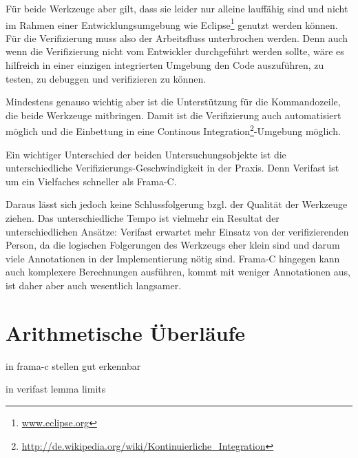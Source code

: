 Für beide Werkzeuge aber gilt, dass sie leider nur alleine lauffähig sind und nicht im Rahmen
einer Entwicklungsumgebung wie Eclipse\footnote{\url{www.eclipse.org}} genutzt werden können. 
Für die Verifizierung muss also der Arbeitsfluss unterbrochen werden. Denn auch wenn die Verifizierung
nicht vom Entwickler durchgeführt werden sollte, wäre es hilfreich in einer einzigen integrierten Umgebung
den Code auszuführen, zu testen, zu debuggen und verifizieren zu können.

Mindestens genauso wichtig aber ist die Unterstützung für die Kommandozeile, die beide Werkzeuge
mitbringen. Damit ist die Verifizierung auch automatisiert möglich und die Einbettung in eine
Continous Integration\footnote{\url{http://de.wikipedia.org/wiki/Kontinuierliche_Integration}}-Umgebung möglich.

Ein wichtiger Unterschied der beiden Untersuchungsobjekte ist die unterschiedliche Verifizierungs-Geschwindigkeit
in der Praxis. Denn Verifast ist um ein Vielfaches schneller\cite[Kap. 3]{jac10-1} als Frama-C. 

Daraus lässt sich jedoch keine Schlussfolgerung bzgl. der Qualität der Werkzeuge ziehen. Das unterschiedliche Tempo ist 
vielmehr ein Resultat der unterschiedlichen Ansätze: Verifast erwartet mehr Einsatz von der verifizierenden Person, da
die logischen Folgerungen des Werkzeugs eher klein sind und darum viele Annotationen in der Implementierung nötig sind.
Frama-C hingegen kann auch komplexere Berechnungen ausführen, kommt mit weniger Annotationen aus, ist daher aber auch
wesentlich langsamer.


\section{Arithmetische Überläufe}

in frama-c stellen gut erkennbar

in verifast lemma limits
